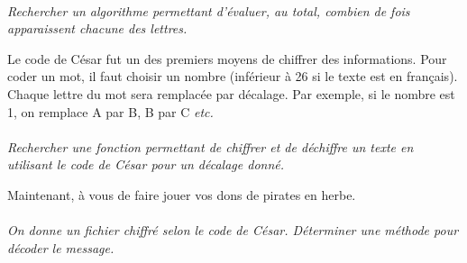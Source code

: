 \documentclass[11pt,oneside]{article}
\begin{document}
\paragraph{}
\textit{Rechercher un algorithme permettant d'évaluer, au total, combien de fois apparaissent chacune des lettres.}


Le code de César fut un des premiers moyens de chiffrer des informations. Pour coder un mot, il faut choisir un nombre (inférieur à 26 si le texte est en français). Chaque lettre du mot sera remplacée par décalage. Par exemple, si le nombre est 1, on remplace A par B, B par C \textit{etc.}

\paragraph{}
\textit{Rechercher une fonction permettant de chiffrer et de déchiffre un texte en utilisant le code de César pour un décalage donné.}

Maintenant, à vous de faire jouer vos dons de pirates en herbe.

\paragraph{}
\textit{On donne un fichier chiffré selon le code de César. Déterminer une méthode pour décoder le message.}




\end{document}
